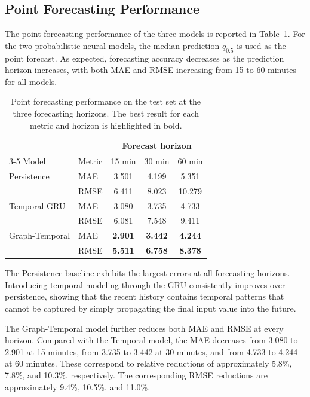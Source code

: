 \subsection{Point Forecasting Performance}
\label{subsec:point_results}

The point forecasting performance of the three models is reported in
Table~\ref{tab:point_results}. For the two probabilistic neural models, the
median prediction $q_{0.5}$ is used as the point forecast. As expected,
forecasting accuracy decreases as the prediction horizon increases, with
both MAE and RMSE increasing from 15 to 60 minutes for all models.

\begin{table}[t]
    \centering
    \caption{Point forecasting performance on the test set at the three
    forecasting horizons. The best result for each metric and horizon is
    highlighted in bold.}
    \label{tab:point_results}
    \begin{tabular}{llccc}
        \toprule
        & & \multicolumn{3}{c}{Forecast horizon} \\
        \cmidrule(lr){3-5}
        Model & Metric & 15 min & 30 min & 60 min \\
        \midrule

        Persistence
        & MAE  & 3.501 & 4.199 & 5.351 \\
        & RMSE & 6.411 & 8.023 & 10.279 \\
        \midrule

        Temporal GRU
        & MAE  & 3.080 & 3.735 & 4.733 \\
        & RMSE & 6.081 & 7.548 & 9.411 \\
        \midrule

        Graph-Temporal
        & MAE  & \textbf{2.901} & \textbf{3.442} & \textbf{4.244} \\
        & RMSE & \textbf{5.511} & \textbf{6.758} & \textbf{8.378} \\
        \bottomrule
    \end{tabular}
\end{table}

The Persistence baseline exhibits the largest errors at all forecasting
horizons. Introducing temporal modeling through the GRU consistently improves
over persistence, showing that the recent history contains temporal patterns
that cannot be captured by simply propagating the final input value into the
future.

The Graph-Temporal model further reduces both MAE and RMSE at every horizon.
Compared with the Temporal model, the MAE decreases from 3.080 to 2.901 at
15 minutes, from 3.735 to 3.442 at 30 minutes, and from 4.733 to 4.244 at
60 minutes. These correspond to relative reductions of approximately
5.8\%, 7.8\%, and 10.3\%, respectively. The corresponding RMSE reductions
are approximately 9.4\%, 10.5\%, and 11.0\%.

